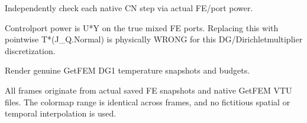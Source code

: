 \documentclass[letterpaper,10pt,english]{sphinxmanual}
\begin{document}

\begin{fulllineitems}
\label{\detokenize{examples/heat:examples.heat.main}}
\pysigstartsignatures
\pysiglinewithargsret
{}
{}
{}
\pysigstopsignatures
\end{fulllineitems}


\begin{fulllineitems}
\label{\detokenize{examples/heat:examples.heat.measure_heat_cn}}
\pysigstartsignatures
\pysiglinewithargsret
{}
{}
{}
\pysigstopsignatures
\sphinxAtStartPar
Independently check each native CN step via actual FE/port power.

\sphinxAtStartPar
Control\sphinxhyphen{}port power is U*Y on the true mixed FE ports. Replacing
this with pointwise T*(J\_Q.Normal) is physically WRONG for this
DG/Dirichlet\sphinxhyphen{}multiplier discretization.

\end{fulllineitems}


\begin{fulllineitems}
\label{\detokenize{examples/heat:examples.heat.render_heat_visuals}}
\pysigstartsignatures
\pysiglinewithargsret
{}
{\sphinxparamcomma {}\sphinxparamcomma {}\sphinxparamcomma {}}
{}
\pysigstopsignatures
\sphinxAtStartPar
Render genuine GetFEM DG1 temperature snapshots and budgets.

\sphinxAtStartPar
All frames originate from actual saved FE snapshots and native
GetFEM VTU files. The colormap range is identical across frames,
and no fictitious spatial or temporal interpolation is used.

\end{fulllineitems}
\end{document}
